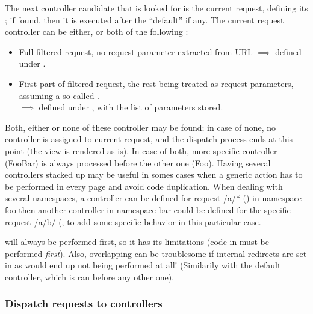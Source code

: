 \documentclass[pdftex,12pt,a4paper]{article}
\begin{document}
The next controller candidate that is looked for is the current request, defining its ; if found, then it is executed after the ``default'' if any.
The current request controller can be either, or both of the following :
\begin{itemize}
	\item Full filtered request, no request parameter extracted from URL $\implies$  defined under .
	\item First part of filtered request, the rest being treated as request parameters, assuming a so-called .\\
	$\implies$  defined under , with the list of parameters \snippet{[bar]} stored.
\end{itemize}
Both, either or none of these controller may be found; in case of none, no controller is assigned to current request, and the dispatch process ends at this point (the view is rendered as is). In case of both, more specific controller (FooBar) is always processed before the other one (Foo).
Having several controllers stacked up may be useful in somes cases when a generic action has to be performed in every page and avoid code duplication. When dealing with several namespaces, a controller can be defined for request /a/* () in namespace foo then another controller in namespace bar could be defined for the specific request /a/b/ (, to add some specific behavior in this particular case.
\begin{note}
 will always be performed first, so it has its limitations (\eg code in  must be performed \emph{first}). Also, overlapping can be troublesome if internal redirects are set in  as  would end up not being performed at all! (Similarily with the default controller, which is ran before any other one).
\end{note}

\subsubsection{Dispatch requests to controllers} \label{sec:dispatch-requests-to-controllers}
\end{document}
